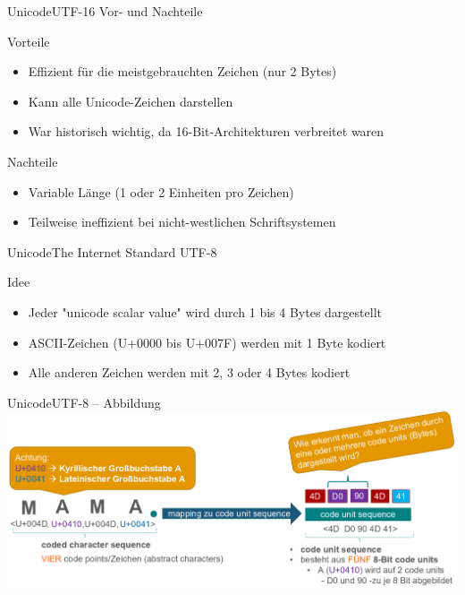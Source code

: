 \documentclass[xelatex,aspectratio=169]{beamer}
\begin{document}
\begin{frame}{Unicode}{UTF-16 Vor- und Nachteile}
    \begin{exampleblock}{Vorteile}
        \begin{itemize}
            \item Effizient für die meistgebrauchten Zeichen (nur 2 Bytes)
            \item Kann alle Unicode-Zeichen darstellen
            \item War historisch wichtig, da 16-Bit-Architekturen verbreitet waren
        \end{itemize}
    \end{exampleblock}
    \begin{alertblock}{Nachteile}
        \begin{itemize}
            \item Variable Länge (1 oder 2 Einheiten pro Zeichen)
            \item Teilweise ineffizient bei nicht-westlichen Schriftsystemen
        \end{itemize}
    \end{alertblock}
\end{frame}

\begin{frame}{Unicode}{The Internet Standard UTF-8}
    \begin{block}{Idee}
        \begin{itemize}
            \item Jeder "unicode scalar value" wird durch 1 bis 4 Bytes dargestellt
            \item ASCII-Zeichen (U+0000 bis U+007F) werden mit 1 Byte kodiert
            \item Alle anderen Zeichen werden mit 2, 3 oder 4 Bytes kodiert
        \end{itemize}
    \end{block}

\end{frame}

\begin{frame}{Unicode}{UTF-8 -- Abbildung}
    \includegraphics[width=\textwidth]{img/codierung_utf8_abbildung.png}
\end{frame}
\end{document}
